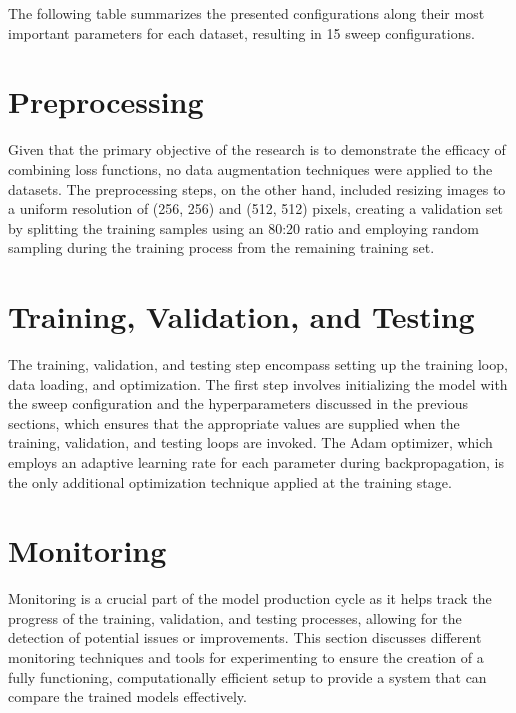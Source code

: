 The following table summarizes the presented configurations along their most important parameters for each dataset, resulting in 15 sweep configurations.



\section{Preprocessing}
\label{sec:preprocessing}
Given that the primary objective of the research is to demonstrate the efficacy of combining loss functions, no data augmentation techniques were applied to the datasets. The preprocessing steps, on the other hand, included resizing images to a uniform resolution of (256, 256) and (512, 512) pixels, creating a validation set by splitting the training samples using an 80:20 ratio and employing random sampling during the training process from the remaining training set.

\section{Training, Validation, and Testing}
\label{sec:training_validation_and_testing}
The training, validation, and testing step encompass setting up the training loop, data loading, and optimization. The first step involves initializing the model with the sweep configuration and the hyperparameters discussed in the previous sections, which ensures that the appropriate values are supplied when the training, validation, and testing loops are invoked. The Adam optimizer, which employs an adaptive learning rate for each parameter during backpropagation, is the only additional optimization technique applied at the training stage.

\section{Monitoring}
\label{sec:monitoring}
Monitoring is a crucial part of the model production cycle as it helps track the progress of the training, validation, and testing processes, allowing for the detection of potential issues or improvements. This section discusses different monitoring techniques and tools for experimenting to ensure the creation of a fully functioning, computationally efficient setup to provide a system that can compare the trained models effectively.

